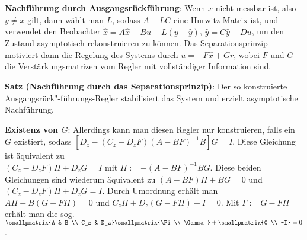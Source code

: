 \linie

\textbf{Nachführung durch Ausgangsrückführung}:
Wenn $x$ nicht messbar ist, also $y \not= x$ gilt, dann wählt man $L$, sodass $A - LC$ eine
Hurwitz-Matrix ist, und verwendet den Beobachter
$\dot{\widehat{x}} = A\widehat{x} + Bu + L(y - \widehat{y})$, $\widehat{y} = C\widehat{y} + Du$,
um den Zustand asymptotisch rekonstruieren zu können.
Das Separationsprinzip motiviert dann die Regelung des Systems durch
$u = -F\widehat{x} + Gr$, wobei $F$ und $G$ die Verstärkungsmatrizen vom Regler mit
vollständiger Information sind.

\textbf{Satz (Nachführung durch das Separationsprinzip)}:
Der so konstruierte Ausgangsrück"-führungs-Regler stabilisiert das System und
erzielt asymptotische Nachführung.


\linie

\textbf{Existenz von $G$}:
Allerdings kann man diesen Regler nur konstruieren, falls ein $G$ existiert, sodass
$[D_z - (C_z - D_z F)(A - BF)^{-1} B] G = I$.
Diese Gleichung ist äquivalent zu\\
$(C_z - D_z F) \Pi + D_z G = I$ mit $\Pi := -(A - BF)^{-1} BG$.
Diese beiden Gleichungen sind wiederum äquivalent zu
$(A - BF)\Pi + BG = 0$ und $(C_z - D_z F) \Pi + D_z G = I$.
Durch Umordnung erhält man
$A\Pi + B(G - F\Pi) = 0$ und $C_z \Pi + D_z (G - F\Pi) - I = 0$.
Mit $\Gamma := G - F\Pi$ erhält man die sog. 
$\smallpmatrix{A & B \\ C_z & D_z} \smallpmatrix{\Pi \\ \Gamma} + \smallpmatrix{0 \\ -I} = 0$.

